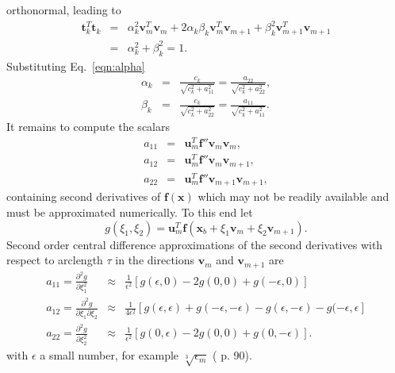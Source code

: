 \documentclass[11pt,openany,twoside]{book}
\numberwithin{equation}{section}		%
\newcommand{\Vector}[1]{\boldsymbol{#1}}
\newcommand{\Eqn}[1]{Eq.\ \ref{#1}}  %
\begin{document}
orthonormal, leading to
\begin{eqnarray}
\label{eqn:alphabetatan}
\Vector{t}_k^T\Vector{t}_k &=& \alpha_k^2\Vector{v}_m^T\Vector{v}_m
	+ 2\alpha_k\beta_k\Vector{v}_m^T\Vector{v}_{m+1}
	+ \beta_k^2\Vector{v}_{m+1}^T\Vector{v}_{m+1} \nonumber \\
  &=& \alpha_k^2 + \beta_k^2 = 1.
\end{eqnarray}
Substituting \Eqn{eqn:alpha}
\begin{eqnarray}
\label{eqn:alphabeta}
\alpha_k &=& \frac{c_k}{\sqrt{c_k^2 + a_{11}^2}} = \frac{a_{22}}{\sqrt{c_k^2 + a_{22}^2}}, \nonumber \\
\beta_k &=&  \frac{c_k}{\sqrt{c_k^2 + a_{22}^2}} = \frac{a_{11}}{\sqrt{c_k^2 + a_{11}^2}}.
\end{eqnarray}
It remains to compute the scalars
\begin{eqnarray}
 a_{11} &=& \Vector{u}_m^T\Vector{f}''\Vector{v}_m\Vector{v}_m, \nonumber \\
 a_{12} &=& \Vector{u}_m^T\Vector{f}''\Vector{v}_m\Vector{v}_{m+1}, \nonumber \\
 a_{22} &=& \Vector{u}_m^T\Vector{f}''\Vector{v}_{m+1}\Vector{v}_{m+1},
\end{eqnarray}
containing
second derivatives of $\Vector{f}(\Vector{x})$ which may not be
readily available and must be approximated numerically.
To this end let
\begin{equation}
g(\xi_1,\xi_2) = \Vector{u}_m^T\Vector{f}(\Vector{x}_b
	+ \xi_1 \Vector{v}_m + \xi_2 \Vector{v}_{m+1}).
\end{equation}
Second order central difference approximations of the second
derivatives with respect to arclength $\tau$ in the directions
$\Vector{v}_m$ and $\Vector{v}_{m+1}$ are
\begin{eqnarray}
\label{eqn:difference}
a_{11} = \frac{\partial^2g}{\partial \xi_1^2}
	&\approx& \frac{1}{\epsilon^2} \left[ g(\epsilon,0)
	- 2g(0,0) + g(-\epsilon,0) \right] \nonumber \\
a_{12} = \frac{\partial^2g}{\partial \xi_1 \partial \xi_2}
	&\approx& \frac{1}{4\epsilon^2} \left[ g(\epsilon,\epsilon)
	+ g(-\epsilon,-\epsilon) - g(\epsilon,-\epsilon)
	- g(-\epsilon,\epsilon \right] \nonumber \\
a_{22} = \frac{\partial^2g}{\partial \xi_2^2} &\approx&
	\frac{1}{\epsilon^2} \left[ g(0,\epsilon) - 2g(0,0) + g(0,-\epsilon) \right].
\end{eqnarray}
with $\epsilon$ a small number, for example $\sqrt[3]{\epsilon_m}$
(\cite{allgower1990numerical} p. 90).
\end{document}
